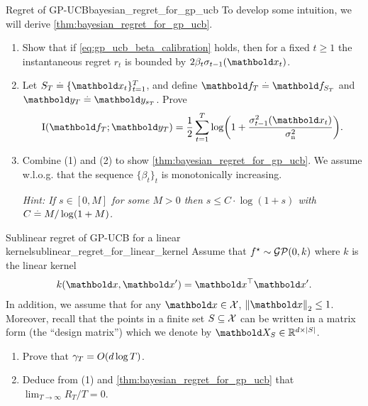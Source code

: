\begin{nexercise}{Regret of GP-UCB}{bayesian_regret_for_gp_ucb}
  To develop some intuition, we will derive \cref{thm:bayesian_regret_for_gp_ucb}.

  \begin{enumerate}
    \item Show that if \cref{eq:gp_ucb_beta_calibration} holds, then for a fixed $t \geq 1$ the instantaneous regret $r_t$ is bounded by $2 \beta_t \sigma_{t-1}(\vx_t)$.

    \item Let $S_T \defeq \{\vx_t\}_{t=1}^T$, and define $\vf_T \defeq \vf_{S_T}$ and $\vy_T \defeq \vy_{s_T}$.
    Prove \begin{align}
      \I{\vf_T}{\vy_T} = \frac{1}{2} \sum_{t=1}^T \log\parentheses*{1 + \frac{\sigma_{t-1}^2(\vx_t)}{\sigman^2}}. \label{eq:bayesian_regret_for_gp_ucb_info_gain_helper}
    \end{align}

    \item\label{exercise:bayesian_regret_for_gp_ucb:3} Combine (1) and (2) to show \cref{thm:bayesian_regret_for_gp_ucb}.
    We assume w.l.o.g. that the sequence $\{\beta_t\}_t$ is monotonically increasing.\par
    \textit{Hint: If $s \in [0,M]$ for some $M > 0$ then $s \leq C \cdot \log(1 + s)$ with $C \overset{.}{=} M / \log(1 + M)$.}
  \end{enumerate}
\end{nexercise}

\begin{nexercise}{Sublinear regret of GP-UCB for a linear kernel}{sublinear_regret_for_linear_kernel}
  Assume that $\opt{f} \sim \GP{0}{k}$ where $k$ is the linear kernel \begin{align*}
    k(\vx, \vxp) = \transpose{\vx}\vxp.
  \end{align*}
  In addition, we assume that for any $\vx \in \spX$, $\norm{\vx}_2 \leq 1$.
  Moreover, recall that the points in a finite set $S \subseteq \mathcal{X}$ can be written in a matrix form (the ``design matrix'') which we denote by $\mX_\sS \in \R^{d \times \card{\sS}}$.

  \begin{enumerate}
    \item Prove that $\gamma_T = \BigO{d \log T}$.

    \item Deduce from (1) and \cref{thm:bayesian_regret_for_gp_ucb} that $\lim_{T\to\infty} R_T / T = 0$.
  \end{enumerate}
\end{nexercise}

